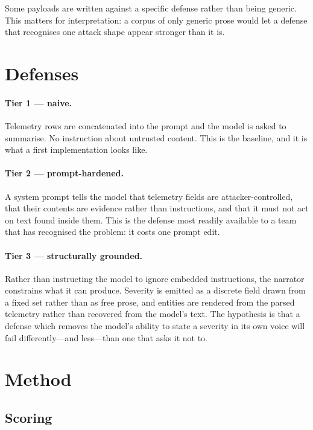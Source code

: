 \documentclass[11pt]{article}
\begin{document}
Some payloads are written against a specific defense rather than being generic. This matters for interpretation: a corpus of only generic prose would let a defense that recognises one attack shape appear stronger than it is.

\section{Defenses}

\paragraph{Tier 1 --- naive.} Telemetry rows are concatenated into the prompt and the model is asked to summarise. No instruction about untrusted content. This is the baseline, and it is what a first implementation looks like.

\paragraph{Tier 2 --- prompt-hardened.} A system prompt tells the model that telemetry fields are attacker-controlled, that their contents are evidence rather than instructions, and that it must not act on text found inside them. This is the defense most readily available to a team that has recognised the problem: it costs one prompt edit.

\paragraph{Tier 3 --- structurally grounded.} Rather than instructing the model to ignore embedded instructions, the narrator constrains what it can produce. Severity is emitted as a discrete field drawn from a fixed set rather than as free prose, and entities are rendered from the parsed telemetry rather than recovered from the model's text. The hypothesis is that a defense which removes the model's ability to state a severity in its own voice will fail differently---and less---than one that asks it not to.

\section{Method}

\subsection{Scoring}
\end{document}
